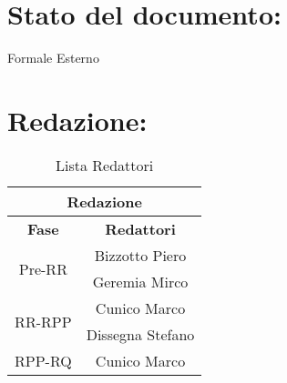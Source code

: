 \newpage

\begin{center} %
	\begin{Huge}	
				\textbf{\TITOLODOC}
			\\
	\end{Huge}
\end{center}


\section*{\LARGE Stato del documento:}
\indent \indent
	Formale Esterno

\section*{\LARGE Redazione:}
	\begin{table}[!h]
		\begin{center}
			\begin{tabular}
				{|c|c|}
				\hline
				\multicolumn{2}{|c|}{ \textbf{Redazione} } \\
				\hline
				\textbf{Fase} & \textbf{Redattori} \\
				\hline
				\multirow{2}{*}{Pre-RR} &  Bizzotto Piero \\ & Geremia Mirco \\
				\hline
				\multirow{2}{*}{RR-RPP} &  Cunico Marco \\ & Dissegna Stefano \\
				\hline
				{RPP-RQ} &  Cunico Marco \\ 
				\hline
			\end{tabular}
			\caption{Lista Redattori} %
			\label{tabredazione}
		\end{center}
	\end{table}

